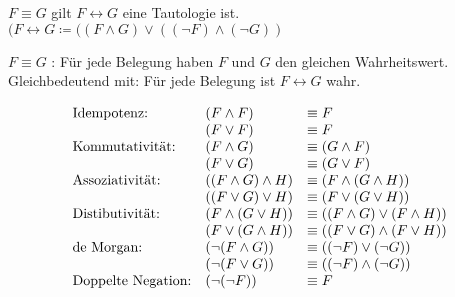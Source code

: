 \begin{satz*}
	$F \equiv G$ gilt \gdw $F \leftrightarrow G$ eine Tautologie ist. \\
	$( F \leftrightarrow G \coloneqq ( ( F \wedge G ) \vee ( ( \neg F ) \wedge ( \neg G ) )$ \\
	\begin{bew}
		$F \equiv G$ : Für jede Belegung haben $F$ und $G$ den gleichen Wahrheitswert.\\
		Gleichbedeutend mit: Für jede Belegung ist $F \leftrightarrow G$ wahr.
	\end{bew}
\end{satz*}
\begin{bsp*}[note = Äquivalenzen, index = logische Gesetze]
	\begin{gather*}
		\begin{array}{ l l l }
			\text{Idempotenz:}		& ( F \wedge F )				&\equiv F							\\
								& ( F \vee F )				&\equiv F							\\
			\text{Kommutativität:}		& ( F \wedge G )				&\equiv ( G \wedge F )					\\
								& ( F \vee G )				&\equiv ( G \vee F )					\\
			\text{Assoziativität:}		& ( ( F \wedge G  ) \wedge H )	&\equiv ( F \wedge ( G  \wedge H ) )		\\
								& ( ( F \vee G  ) \vee H )		&\equiv ( F \vee ( G  \vee H ) )			\\
			\text{Distibutivität:}		& ( F \wedge ( G  \vee H ) )		&\equiv ( ( F \wedge G ) \vee ( F \wedge H ) )	\\
								& ( F \vee ( G  \wedge H ) )		&\equiv ( ( F \vee G ) \wedge ( F \vee H ) )	\\
			\text{de Morgan:}		& ( \neg ( F \wedge G ) )		&\equiv( ( \neg F ) \vee ( \neg G ) )		\\
								& ( \neg ( F \vee G ) )			&\equiv( ( \neg F ) \wedge ( \neg G ) )		\\
			\text{Doppelte Negation:}	& ( \neg ( \neg F ) )			&\equiv F							
		\end{array}
	\end{gather*}
\end{bsp*}

